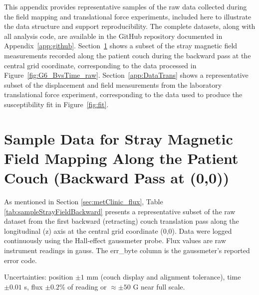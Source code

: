 %


This appendix provides representative samples of the raw data collected during
the field mapping and translational force experiments, included here to
illustrate the data structure and support reproducibility. The complete datasets,
along with all analysis code, are available in the GitHub repository documented
in Appendix~\ref{app:github}. Section~\ref{app:DataStrayField} shows a subset of
the stray magnetic field measurements recorded along the patient couch during the
backward pass at the central grid coordinate, corresponding to the data processed
in Figure~\ref{fig:G6_BvsTime_raw}. Section~\ref{app:DataTrans} shows
a representative subset of the displacement and field measurements from the
laboratory translational force experiment, corresponding to the data used to
produce the susceptibility fit in Figure~\ref{fig:fit}.



\section{Sample Data for Stray Magnetic Field Mapping Along the Patient Couch (Backward Pass at (0,0))}
\label{app:DataStrayField}

As mentioned in Section \ref{sec:metClinic_flux}, Table \ref{tab:sampleStrayFieldBackward} presents a representative subset of the raw dataset from the first backward (retracting) couch translation pass along the longitudinal (z) axis at the central grid coordinate (0,0). Data were logged continuously using the Hall-effect gaussmeter probe. Flux values are raw instrument readings in gauss. The err\_byte column is the gaussmeter's reported error code.

Uncertainties: position $\pm 1$ mm (couch display and alignment tolerance), time $\pm 0.01$ s, flux $\pm 0.2\%$ of reading or $\approx \pm 50$ G near full scale.

